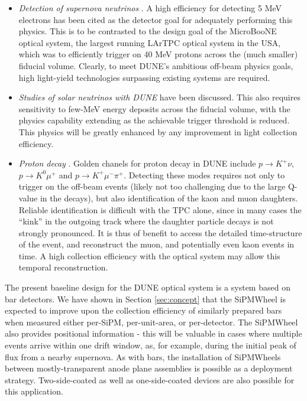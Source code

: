\begin{itemize}
\item \emph{Detection of supernova neutrinos} \cite{Ankowski:2016lab}.  A high efficiency for detecting 5 MeV electrons has been cited as the detector goal for adequately performing this physics.  This is to be contrasted to the design goal of the MicroBooNE optical system, the largest running LArTPC optical system in the USA, which was to efficiently trigger on 40 MeV protons across the (much smaller) fiducial volume.  Clearly, to meet DUNE's ambitious off-beam physics goals, high light-yield technologies surpassing existing systems are required.
\item \emph{Studies of solar neutrinos with DUNE} \cite{Kudryavtsev:2016ybl} have been discussed. This also requires sensitivity to few-MeV energy deposits across the fiducial volume, with the physics capability extending as the achievable trigger threshold is reduced.  This physics will be greatly enhanced by any improvement in light collection efficiency.
\item \emph{Proton decay} \cite{Adams:2013qkq}.  Golden chanels for proton decay in DUNE include $p \rightarrow K^+ \nu$, $p \rightarrow K^0 \mu^+$ and $p \rightarrow K^+ \mu^- \pi^+$.  Detecting these modes requires not only to trigger on the off-beam events (likely not too challenging due to the large Q-value in the decays), but also identification of the kaon and muon daughters.  Reliable identification is difficult with the TPC alone, since in many cases the ``kink'' in the outgoing track where the daughter particle decays is not strongly pronounced.   It is thus of benefit to access the detailed time-structure of the event, and reconstruct the muon, and potentially even kaon events in time.  A high collection efficiency with the optical system may allow this temporal reconstruction.
\end{itemize}

The present baseline design for the DUNE optical system is a system based on bar detectors.  We have shown in Section \ref{sec:concept} that the SiPMWheel is expected to improve upon the collection efficiency of similarly prepared bars when measured either per-SiPM, per-unit-area, or per-detector.    The SiPMWheel also provides positional information - this will be valuable in cases where multiple events arrive within one drift window, as, for example, during the initial peak of flux from a nearby supernova.  As with bars, the installation of SiPMWheels between mostly-transparent anode plane assemblies is possible as a deployment strategy.   Two-side-coated as well as one-side-coated devices are also possible for this application.

